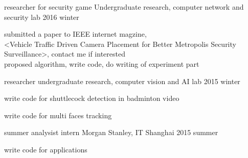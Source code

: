 

\begin{cventries}

  \cventry
    {researcher for security game} %
    {Undergraduate research, computer network and security lab} %
    { } %
    {2016 winter} %
    {
      \begin{cvitems} %
        \item {submitted a paper to IEEE internet magzine,\\
        <Vehicle Traffic Driven Camera Placement for Better Metropolis Security Surveillance>, contact me if interested\\
        proposed algorithm, write code, do writing of experiment part}
      \end{cvitems}
    }


  \cventry
    {researcher} %
    {undergraduate research, computer vision and AI lab} %
    { } %
    {2015 winter} %
    {
      \begin{cvitems} %
        \item {write code for shuttlecock detection in badminton video}
        \item {write code for multi faces tracking}
      \end{cvitems}
    }

  \cventry
    {summer analysist intern} %
    {Morgan Stanley, IT} %
    {Shanghai} %
    {2015 summer} %
    {
      \begin{cvitems} %
        \item {write code for applications}
      \end{cvitems}
    }


\end{cventries}
